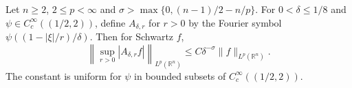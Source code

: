 Let $n\ge2$, $2\le p<\infty$ and $\sigma>\max\{0,(n-1)/2-n/p\}$. For $0<\delta\le1/8$ and $\psi\in C_c^\infty((1/2,2))$, define $A_{\delta,r}$ for $r>0$ by the Fourier symbol $\psi((1-|\xi|/r)/\delta)$. Then for Schwartz $f$,
\[
\left\|\sup_{r>0}|A_{\delta,r}f|\right\|_{L^p(\mathbb R^n)}
\le C\delta^{-\sigma}\|f\|_{L^p(\mathbb R^n)}.
\]
The constant is uniform for $\psi$ in bounded subsets of $C_c^\infty((1/2,2))$.

